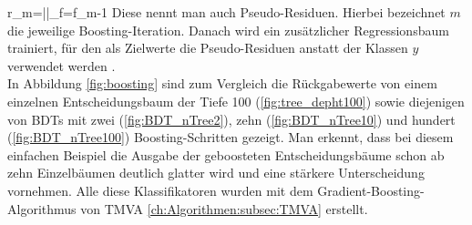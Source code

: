 \beq
r_m=\left|\right|_{f=f_{m-1}}
\label{eq:pseudo_residual}
\eeq
Diese nennt man auch Pseudo-Residuen. Hierbei bezeichnet $m$ die jeweilige Boosting-Iteration. Danach wird ein zus\"atzlicher Regressionsbaum trainiert, f\"ur den als Zielwerte die Pseudo-Residuen anstatt der Klassen $y$ verwendet werden \cite{Hocker:2007ht}.\\
In Abbildung \ref{fig:boosting} sind zum Vergleich die R\"uckgabewerte von einem einzelnen Entscheidungsbaum der Tiefe 100 (\ref{fig:tree_depht100}) sowie diejenigen von BDTs mit zwei (\ref{fig:BDT_nTree2}), zehn (\ref{fig:BDT_nTree10}) und hundert (\ref{fig:BDT_nTree100}) Boosting-Schritten gezeigt. Man erkennt, dass bei diesem einfachen Beispiel die Ausgabe der geboosteten Entscheidungsb\"aume schon ab zehn Einzelb\"aumen deutlich glatter wird und eine st\"arkere Unterscheidung vornehmen. Alle diese Klassifikatoren wurden mit dem Gradient-Boosting-Algorithmus von TMVA \ref{ch:Algorithmen:subsec:TMVA} erstellt.

